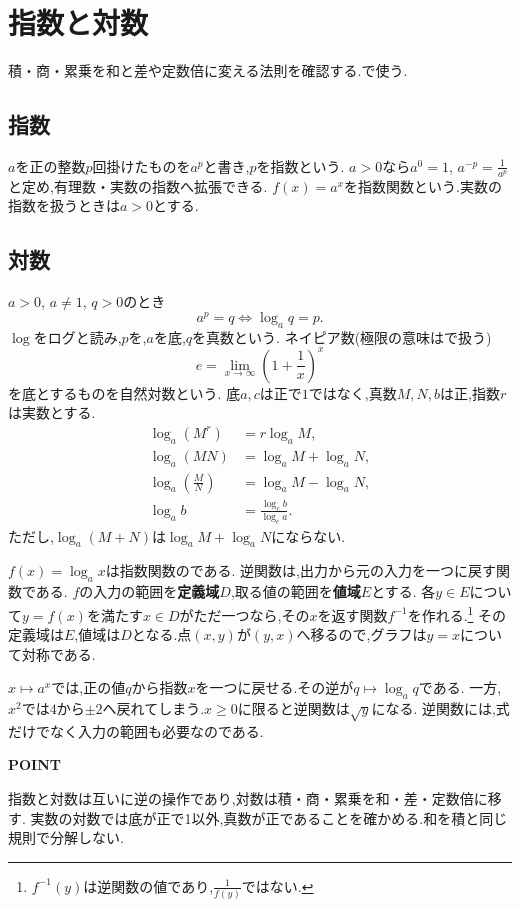 
\section{指数と対数}\label{節：指数と対数}
積・商・累乗を和と差や定数倍に変える法則を確認する.で使う.

\subsection{指数}\label{節：指数}
$a$を正の整数$p$回掛けたものを$a^p$と書き,$p$を指数という.
$a>0$なら$a^0=1$, $a^{-p}=\frac{1}{a^p}$と定め,有理数・実数の指数へ拡張できる.
$f(x)=a^x$を指数関数という.実数の指数を扱うときは$a>0$とする.

\subsection{対数}\label{節：対数}
$a>0$, $a\ne1$, $q>0$のとき
\[
  a^p=q\iff\log_a q=p.
\]
$\log$をログと読み,$p$を,$a$を底,$q$を真数という.
ネイピア数(極限の意味はで扱う)
\[
  e=\lim_{x\to\infty}\left(1+\frac1x\right)^x
\]
を底とするものを自然対数という.
底$a,c$は正で$1$ではなく,真数$M,N,b$は正,指数$r$は実数とする.
\begin{align*}
  \log_a(M^r)&=r\log_a M,\\
  \log_a(MN)&=\log_a M+\log_a N,\\
  \log_a\left(\frac{M}{N}\right)&=\log_a M-\log_a N,\\
  \log_a b&=\frac{\log_c b}{\log_c a}.
\end{align*}
ただし,$\log_a(M+N)$は$\log_a M+\log_a N$にならない.

$f(x)=\log_a x$は指数関数のである.
逆関数は,出力から元の入力を一つに戻す関数である.
$f$の入力の範囲を\textbf{定義域}$D$,取る値の範囲を\textbf{値域}$E$とする.
各$y\in E$について$y=f(x)$を満たす$x\in D$がただ一つなら,その$x$を返す関数$f^{-1}$を作れる.\footnote{$f^{-1}(y)$は逆関数の値であり,$\frac{1}{f(y)}$ではない.}
その定義域は$E$,値域は$D$となる.点$(x,y)$が$(y,x)$へ移るので,グラフは$y=x$について対称である.

$x\mapsto a^x$では,正の値$q$から指数$x$を一つに戻せる.その逆が$q\mapsto\log_a q$である.
一方,$x^2$では$4$から$\pm2$へ戻れてしまう.$x\ge0$に限ると逆関数は$\sqrt y$になる.
逆関数には,式だけでなく入力の範囲も必要なのである.

\begin{bookpoint}
  \textbf{POINT}\par
  指数と対数は互いに逆の操作であり,対数は積・商・累乗を和・差・定数倍に移す.
  実数の対数では底が正で1以外,真数が正であることを確かめる.和を積と同じ規則で分解しない.
\end{bookpoint}
